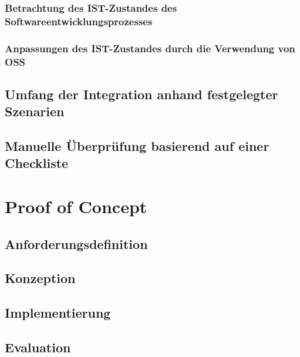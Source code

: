 \documentclass[12pt,titlepage]{article}
\begin{document}
\subsubsection{Betrachtung des IST-Zustandes des Softwareentwicklungsprozesses}


\subsubsection{Anpassungen des IST-Zustandes durch die Verwendung von OSS}


\subsection{Umfang der Integration anhand festgelegter Szenarien}


\subsection{Manuelle Überprüfung basierend auf einer Checkliste}


\section{Proof of Concept}


\subsection{Anforderungsdefinition}

\subsection{Konzeption}

\subsection{Implementierung}

\newpage
\subsection{Evaluation}

\end{document}
